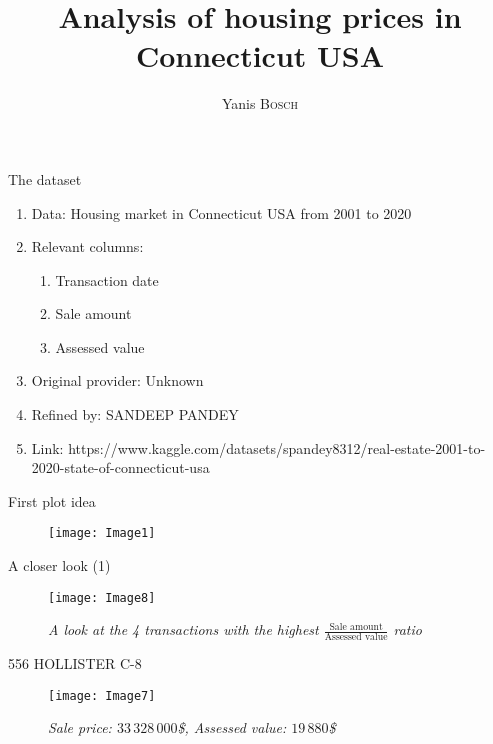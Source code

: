 \documentclass{beamer}
\begin{document}
	\begin{frame}
		\title{Analysis of housing prices in Connecticut USA}
		\author{Yanis \textsc{Bosch}}
		\maketitle
	\end{frame}

	\begin{frame}{The dataset}
		\begin{enumerate}
			\item Data: Housing market in Connecticut USA from 2001 to 2020
			\item Relevant columns: 
				\begin{enumerate}
   					\item Transaction date
    					\item Sale amount
    					\item Assessed value
				\end{enumerate}
			\item Original provider: Unknown
			\item Refined by: SANDEEP PANDEY
			\item Link: https://www.kaggle.com/datasets/spandey8312/real-estate-2001-to-2020-state-of-connecticut-usa
		\end{enumerate}
	\end{frame}

	\begin{frame}{First plot idea}
		\begin{figure}[h]
			\centering
			\texttt{[image: Image1]}
		\end{figure}
	\end{frame}
	
	\begin{frame}{A closer look (1)}
		\begin{figure}[h]
			\centering
			\texttt{[image: Image8]}
			\caption{\textit{A look at the 4 transactions with the highest $\frac{\text{Sale amount}}{\text{Assessed value}}$ ratio}}
		\end{figure}
	\end{frame}

	\begin{frame}{556 HOLLISTER C-8}
		\begin{figure}[h]
			\centering
			\texttt{[image: Image7]}
			\caption{\textit{Sale price: $33\,328\,000$\$, Assessed value: $19\,880$\$}}
		\end{figure}
	\end{frame}
\end{document}

